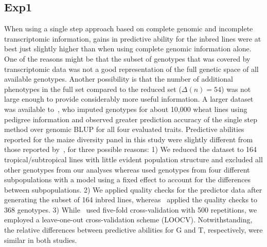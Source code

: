 \documentclass[12pt,titlepage]{article}
\begin{document}
\subsection{Exp1}
When using a single step approach based on complete genomic and incomplete
transcriptomic information, gains in predictive ability for the inbred lines
were at best just slightly higher than when using complete genomic information
alone.
One of the reasons might be that the subset of genotypes that was covered by
transcriptomic data was not a good representation of the full genetic space of
all available genotypes.
Another possibility is that the number of additional phenotypes in the full
set compared to the reduced set ($\Delta(n) = 54$) was not large enough to
provide considerably more useful information.
A larger dataset was available to~, who imputed genotypes
for about 10,000 wheat lines using pedigree information and observed greater
prediction accuracy of the single step method over genomic BLUP for all four
evaluated traits.
Predictive abilities reported for the maize diversity panel in this study were
slightly different from those reported by~, for three
possible reasons:
1) We reduced the dataset to 164 tropical/subtropical lines with little evident
population structure and excluded all other genotypes from our analyses whereas
 used genotypes from four different subpopulations with a model
using a fixed effect to account for the differences between subpopulations.
2) We applied quality checks for the predictor data after generating the subset
of 164 inbred lines, whereas~ applied the quality checks to 368
genotypes.
3) While~ used five-fold cross-validation with 500 repetitions,
we employed a leave-one-out cross-validation scheme (LOOCV).
Notwithstanding, the relative differences between predictive abilities for G 
and T, respectively, were similar in both studies.
\end{document}
